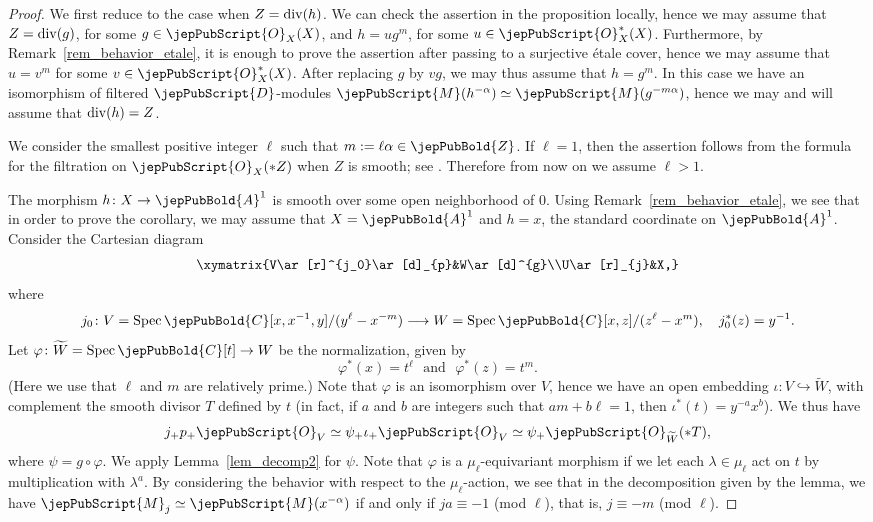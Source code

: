 \begin{proof}
We first reduce to the case when $Z={\rm div}(h)$. We can check the assertion in the proposition locally, hence we may assume that
$Z={\rm div}(g)$, for some $g\in\jepPubScript{O}_X(X)$, and $h=ug^m$, for some $u\in\jepPubScript{O}_X^*(X)$. Furthermore, by Remark~\ref{rem_behavior_etale},
it is enough to prove the assertion after passing to a surjective \'{e}tale cover, hence we may assume that $u=v^m$ for some $v\in\jepPubScript{O}_X^*(X)$.
After replacing $g$ by $vg$, we may thus assume that $h=g^m$. In this case we have an isomorphism
of filtered $\jepPubScript{D}$-modules $\jepPubScript{M}(h^{-\alpha})\simeq\jepPubScript{M}(g^{-m\alpha})$, hence we may and will assume that
${\rm div}(h)=Z$.


We consider the smallest positive integer $\ell$ such that $m:=\ell\alpha\in\jepPubBold{Z}$.
If $\ell=1$, then the assertion follows from the formula for the filtration on $\jepPubScript{O}_X(*Z)$ when $Z$ is smooth; see \cite[Prop. 8.2]{MP1}. Therefore from now on we assume $\ell>1$.

The morphism $h\colon X\to\jepPubBold{A}^1$ is smooth over some open neighborhood of $0$. Using Remark~\ref{rem_behavior_etale}, we see that in order to prove the corollary,
we may assume that $X=\jepPubBold{A}^1$ and $h=x$, the standard coordinate on $\jepPubBold{A}^1$.
Consider the Cartesian diagram 
$$
{\def\labelstyle{\textstyle}\xymatrix{V\ar[r]^{j_0}\ar[d]_{p}&W\ar[d]^{g}\\U\ar[r]_{j}&X,}}
$$
where 
$$j_0\colon V=\operatorname{Spec} \jepPubBold{C}[x,x^{-1},y]/(y^{\ell}-x^{-m})\longrightarrow W=\operatorname{Spec} \jepPubBold{C}[x,z]/(z^{\ell}-x^m),\quad j_0^*(z)=y^{-1}.$$
Let
 $\varphi\colon\widetilde{W}= \operatorname{Spec} \jepPubBold{C}[t] \to W$ be the normalization, given by 
$$\varphi^*(x)=t^{\ell} \,\,\,\, \text{and} \,\,\,\, \varphi^*(z)=t^m.$$ 
(Here we use that $\ell$ and $m$ are relatively prime.) 
Note that $\varphi$ is an isomorphism over $V$, hence we have an open embedding $\iota\colon V\hookrightarrow \widetilde{W}$, with complement the smooth divisor $T$ defined by $t$
(in fact, if $a$ and $b$ are integers such that $am+b\ell=1$, then $\iota^*(t)=y^{-a}x^b$). 
We thus have 
$$j_+p_+\jepPubScript{O}_V\simeq \psi_+\iota_+\jepPubScript{O}_V\simeq\psi_+\jepPubScript{O}_{\widetilde{W}}(*T),$$
where $\psi=g\circ\varphi$. We apply Lemma~\ref{lem_decomp2} for $\psi$. 
Note that $\varphi$ is a $\mu_{\ell}$-equivariant morphism if we let each $\lambda\in\mu_{\ell}$ act on $t$ by multiplication with $\lambda^a$.
By considering the behavior with respect to the
$\mu_{\ell}$-action, we see that
 in the decomposition given by the lemma, we have
$\jepPubScript{M}_j\simeq\jepPubScript{M}(x^{-\alpha})$ if and only if $ja\equiv -1$ (mod $\ell$), that is,
$j\equiv -m$ (mod $\ell$). 


\end{proof}
